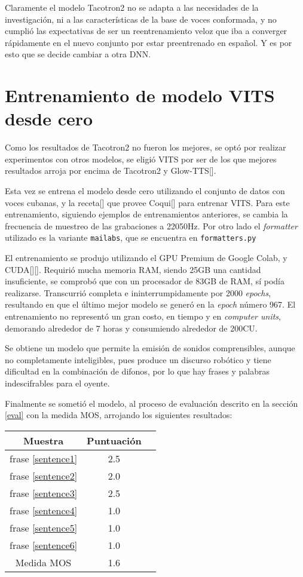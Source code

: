 Claramente el modelo Tacotron2 no se adapta a las necesidades de la investigación, ni a las características de la base de voces conformada, y no cumplió las expectativas de ser un reentrenamiento veloz que iba a converger rápidamente en el nuevo conjunto por estar preentrenado en español. Y es por esto que se decide cambiar a otra DNN.


\section{Entrenamiento de modelo VITS desde cero} \label{vits_s}
Como los resultados de Tacotron2 no fueron los mejores, se optó por realizar experimentos con otros modelos, se eligió VITS por ser de los que mejores resultados arroja por encima de Tacotron2 y Glow-TTS[\cite{kim2021conditional}].

Esta vez se entrena el modelo desde cero utilizando el conjunto de datos con voces cubanas, y la receta[\cite{train-vits}] que provee Coqui[\cite{coqui-doc}] para entrenar VITS. Para este entrenamiento, siguiendo ejemplos de entrenamientos anteriores, se cambia la frecuencia de muestreo de las grabaciones a 22050Hz. Por otro lado el \textit{formatter} utilizado es la variante \texttt{mailabs}, que se encuentra en \texttt{formatters.py}

El entrenamiento se produjo utilizando el GPU Premium de Google Colab, y CUDA[\cite{cuda}][\cite{cuda1}]. Requirió mucha memoria RAM, siendo 25GB una cantidad insuficiente, se comprobó que con un procesador de 83GB de RAM, sí podía realizarse. Transcurrió completa e ininterrumpidamente por 2000 \textit{epochs}, resultando en que el último mejor modelo se generó en la \textit{epoch} número 967. El entrenamiento no representó un gran costo, en tiempo y en \textit{computer units}, demorando alrededor de 7 horas y consumiendo alrededor de 200CU.

Se obtiene un modelo que permite la emisión de sonidos comprensibles, aunque no completamente inteligibles, pues produce un discurso robótico y tiene dificultad en la combinación de difonos, por lo que hay frases y palabras indescifrables para el oyente.

Finalmente se sometió el modelo, al proceso de evaluación descrito en la sección \ref{eval} con la medida MOS, arrojando los siguientes resultados:

\begin{center} \begin{tabular}{ |c|c|c| } 
\hline 
Muestra & Puntuación \\
\hline
frase \ref{sentence1} & 2.5 \\
frase \ref{sentence2} & 2.0 \\
frase \ref{sentence3} & 2.5 \\
frase \ref{sentence4} & 1.0 \\
frase \ref{sentence5} & 1.0 \\
frase \ref{sentence6} & 1.0 \\
\hline
Medida MOS & 1.6\\
 \hline 
\end{tabular} 
\end{center}

